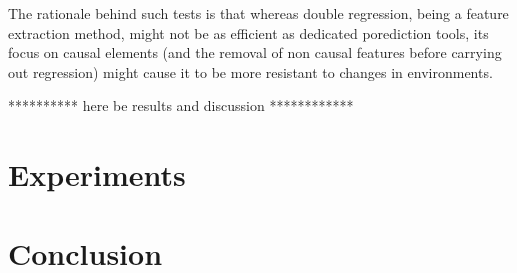 \documentclass{article}
\begin{document}
The rationale behind such tests is that whereas double regression, being a feature extraction method, might not be as efficient as dedicated porediction tools, its focus on causal elements (and the removal of non causal features before carrying out regression) might cause it to be more resistant to changes in environments. 

********** here be results and discussion ************

\section{Experiments}

\section{Conclusion}

\clearpage
\newpage



\end{document}
